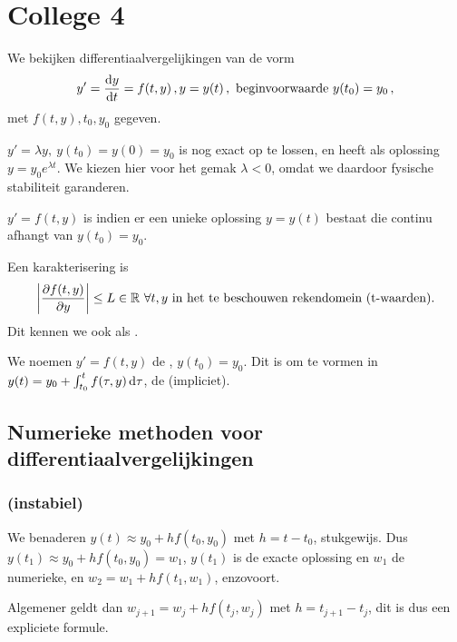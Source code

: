 \documentclass{2wn20summary}
\begin{document}
	\newpage
	\section{College 4}
		We bekijken differentiaalvergelijkingen van de vorm
		\[
			y' = \frac{\mathop{}\!\mathrm{d} y}{\mathop{}\!\mathrm{d} t} = f(t,y) \,, y = y(t) \,, \text{ beginvoorwaarde } y(t_0) = y_0 \,,
		 \]
		 met $f(t,y),t_0,y_0$ gegeven.

		 \begin{voorbeeld}

		 	$y'=\lambda y,\ y(t_0)=y(0)=y_0$ is nog exact op te lossen, en heeft als oplossing $y=y_0 e^{\lambda t}$. We kiezen hier voor het gemak $\lambda <0$, omdat we daardoor fysische stabiliteit garanderen.
		 \end{voorbeeld}
		 \begin{define}
		 	$y'=f(t,y)$ is  indien er een unieke oplossing $y=y(t)$ bestaat die continu afhangt van $y(t_0)=y_0$.

		 	Een karakterisering is
		 	\[
			 	{\left|\frac{\partial f(t,y)}{\partial y}\right|} \le L \in \mathbb{R} \ \forall{t,y} \text{ in het te beschouwen rekendomein (t-waarden)}.
		 	 \]
		 	 Dit kennen we ook als .
		 \end{define}

		 \begin{define}
		 	We noemen $y'=f(t,y)$ de , $y(t_0) = y_0$. Dit is om te vormen in $y(t) = y_0 + \int_{t_0}^t f(\tau,y) \mathop{}\!\mathrm{d} \tau$, de  (impliciet).
		 \end{define}

		 \subsection{Numerieke methoden voor differentiaalvergelijkingen}
		 \subsubsection{ (instabiel)}
			 We benaderen $y(t) \approx y_0 + h f(t_0,y_0)$ met $h=t-t_0$, stukgewijs. Dus $y(t_1) \approx y_0 + h f(t_0,y_0) = w_1$, $y(t_1)$ is de exacte oplossing en $w_1$ de numerieke, en $w_2 = w_1 + h f(t_1,w_1)$, enzovoort.

			 Algemener geldt dan $w_{j+1}= w_j+h f(t_j,w_j)$ met $h=t_{j+1}-t_j$, dit is dus een expliciete formule.
			 
\end{document}
